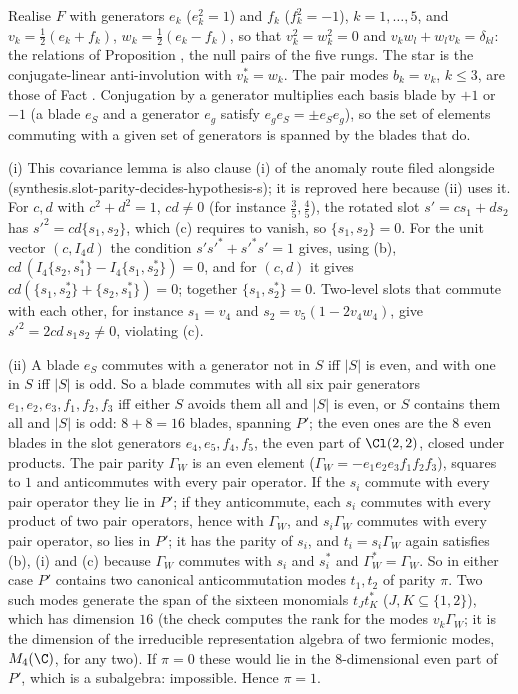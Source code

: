 Realise $F$ with generators $e_{k}$ ($e_{k}^{2} = 1$) and $f_{k}$ ($f_{k}^{2} = -1$), $k = 1, \dots, 5$, and $v_{k} = \tfrac12(e_{k} + f_{k})$, $w_{k} = \tfrac12(e_{k} - f_{k})$, so that $v_{k}^{2} = w_{k}^{2} = 0$ and $v_{k}w_{l} + w_{l}v_{k} = \delta_{kl}$: the relations of Proposition , the null pairs of the five rungs. The star is the conjugate-linear anti-involution with $v_{k}^{*} = w_{k}$. The pair modes $b_{k} = v_{k}$, $k \le 3$, are those of Fact . Conjugation by a generator multiplies each basis blade by $+1$ or $-1$ (a blade $e_{S}$ and a generator $e_{g}$ satisfy $e_{g}e_{S} = \pm e_{S}e_{g}$), so the set of elements commuting with a given set of generators is spanned by the blades that do.

(i) This covariance lemma is also clause (i) of the anomaly route filed alongside (synthesis.slot-parity-decides-hypothesis-s); it is reproved here because (ii) uses it. For $c, d$ with $c^{2} + d^{2} = 1$, $cd \ne 0$ (for instance $\tfrac35, \tfrac45$), the rotated slot $s' = cs_{1} + ds_{2}$ has $s'^{2} = cd\{s_{1}, s_{2}\}$, which (c) requires to vanish, so $\{s_{1}, s_{2}\} = 0$. For the unit vector $(c, I_{4}d)$ the condition $s's'^{*} + s'^{*}s' = 1$ gives, using (b), $cd\,(I_{4}\{s_{2}, s_{1}^{*}\} - I_{4}\{s_{1}, s_{2}^{*}\}) = 0$, and for $(c, d)$ it gives $cd(\{s_{1}, s_{2}^{*}\} + \{s_{2}, s_{1}^{*}\}) = 0$; together $\{s_{1}, s_{2}^{*}\} = 0$. Two-level slots that commute with each other, for instance $s_{1} = v_{4}$ and $s_{2} = v_{5}(1 - 2v_{4}w_{4})$, give $s'^{2} = 2cd\,s_{1}s_{2} \ne 0$, violating (c).

(ii) A blade $e_{S}$ commutes with a generator not in $S$ iff $|S|$ is even, and with one in $S$ iff $|S|$ is odd. So a blade commutes with all six pair generators $e_{1}, e_{2}, e_{3}, f_{1}, f_{2}, f_{3}$ iff either $S$ avoids them all and $|S|$ is even, or $S$ contains them all and $|S|$ is odd: $8 + 8 = 16$ blades, spanning $P'$; the even ones are the $8$ even blades in the slot generators $e_{4}, e_{5}, f_{4}, f_{5}$, the even part of $\Cl(2,2)$, closed under products. The pair parity $\Gamma_{W}$ is an even element ($\Gamma_{W} = -e_{1}e_{2}e_{3}f_{1}f_{2}f_{3}$), squares to $1$ and anticommutes with every pair operator. If the $s_{i}$ commute with every pair operator they lie in $P'$; if they anticommute, each $s_{i}$ commutes with every product of two pair operators, hence with $\Gamma_{W}$, and $s_{i}\Gamma_{W}$ commutes with every pair operator, so lies in $P'$; it has the parity of $s_{i}$, and $t_{i} = s_{i}\Gamma_{W}$ again satisfies (b), (i) and (c) because $\Gamma_{W}$ commutes with $s_{i}$ and $s_{i}^{*}$ and $\Gamma_{W}^{*} = \Gamma_{W}$. So in either case $P'$ contains two canonical anticommutation modes $t_{1}, t_{2}$ of parity $\pi$. Two such modes generate the span of the sixteen monomials $t_{J}t_{K}^{*}$ ($J, K \subseteq \{1, 2\}$), which has dimension $16$ (the check computes the rank for the modes $v_{k}\Gamma_{W}$; it is the dimension of the irreducible representation algebra of two fermionic modes, $M_{4}(\C)$, for any two). If $\pi = 0$ these would lie in the $8$-dimensional even part of $P'$, which is a subalgebra: impossible. Hence $\pi = 1$.

